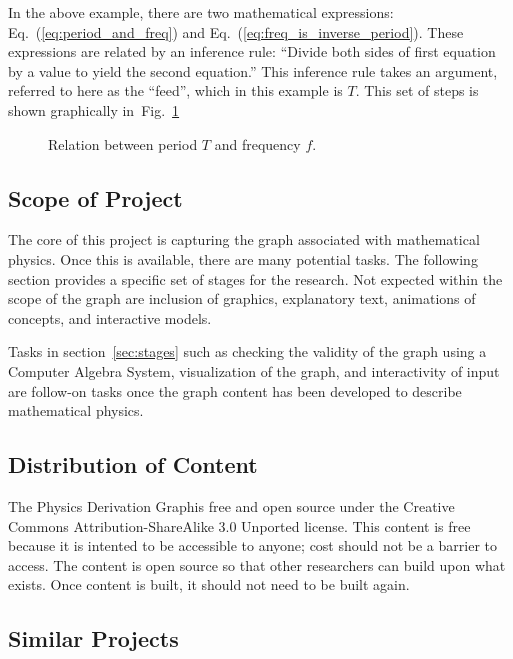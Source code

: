 \documentclass{article}
\newcommand{\eqn}[1]{Eq.\ (\ref{#1})}
\newcommand{\pdg}{Physics Derivation Graph}
\begin{document}
\begin{multicols}{2}
In the above example, there are two mathematical expressions: \eqn{eq:period_and_freq} and \eqn{eq:freq_is_inverse_period}. These expressions are related by an inference rule: ``Divide both sides of first equation by a value to yield the second equation.'' This inference rule takes an argument, referred to here as the ``feed'', which in this example is $T$. This set of steps is shown graphically in~Fig.~\ref{fig:freq_period}

\begin{center}
\begin{figure}
\caption{Relation between period $T$ and frequency $f$.\label{fig:freq_period}}
\end{figure}
\end{center}

\subsection{Scope of Project\label{sec:scope}}

The core of this project is capturing the graph associated with mathematical physics. Once this is available, there are many potential tasks. The following section provides a specific set of stages for the research. Not expected within the scope of the graph are inclusion of graphics, explanatory text, animations of concepts, and interactive models. 

Tasks in section~\ref{sec:stages} such as checking the validity of the graph using a Computer Algebra System, visualization of the graph, and interactivity of input are follow-on tasks once the graph content has been developed to describe mathematical physics.

\subsection{Distribution of Content\label{sec:distribution}}

The \pdg is free and open source under the Creative Commons Attribution-ShareAlike 3.0 Unported license. This content is free because it is intented to be accessible to anyone; cost should not be a barrier to access. The content is open source so that other researchers can build upon what exists. Once content is built, it should not need to be built again. 

\subsection{Similar Projects\label{sec:similar_projects}}


\end{multicols}
\end{document}
